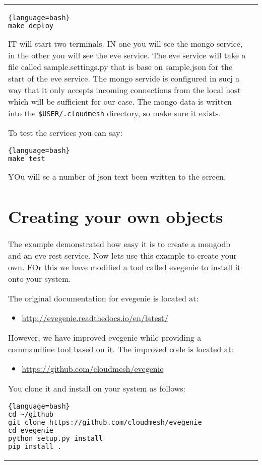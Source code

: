 \begin{tabular}{ll}
\begin{lstlisting}{language=bash}
make deploy
\end{lstlisting}

IT will start two terminals. IN one you will see the mongo service, in
the other you will see the eve service. The eve service will take a file
called sample.settings.py that is base on sample.json for the start of
the eve service. The mongo servide is configured in sucj a way that it
only accepts incoming connections from the local host which will be
sufficient for our case. The mongo data is written into the
\verb|$USER/.cloudmesh| directory, so make sure it exists.

To test the services you can say:

\begin{lstlisting}{language=bash}
make test
\end{lstlisting}

YOu will se a number of json text been written to the screen.

\section{Creating your own objects}\label{creating-your-own-objects}

The example demonstrated how easy it is to create a mongodb and an eve
rest service. Now lets use this example to create your own. FOr this we
have modified a tool called evegenie to install it onto your system.

The original documentation for evegenie is located at:

\begin{itemize}
\item
 \url{http://evegenie.readthedocs.io/en/latest/}
\end{itemize}

However, we have improved evegenie while providing a commandline tool
based on it. The improved code is located at:

\begin{itemize}
\tightlist
\item
 \url{https://github.com/cloudmesh/evegenie}
\end{itemize}

You clone it and install on your system as follows:

\begin{lstlisting}{language=bash}
cd ~/github
git clone https://github.com/cloudmesh/evegenie
cd evegenie
python setup.py install
pip install .
\end{lstlisting}


\end{tabular}
